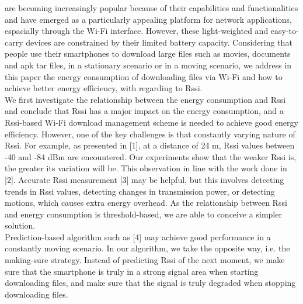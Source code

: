 \documentclass[journal]{IEEEtran}
\begin{document}
  are becoming increasingly popular because of
their capabilities and functionalities and have emerged as a particularly appealing platform for network applications, 
espacially through the Wi-Fi interface.
However, these light-weighted and easy-to-carry devices are constrained by their limited battery capacity.
Considering that people use their smartphones to download large files such as movies, documents and apk tar files, 
in a stationary scenario or in a moving scenario,
we address in this paper the energy consumption of downloading files via Wi-Fi and how to achieve better energy efficiency, 
with regarding to Rssi.
\\
\indent
We first investigate the relationship between the energy consumption and Rssi and conclude that Rssi has a major 
impact on the energy consumption, and a Rssi-based Wi-Fi download management scheme is needed to achieve good energy efficiency. 
However, one of the key challenges is that constantly varying nature of Rssi. For example, as presented in [1],
at a distance of 24 m, Rssi values between -40 and -84 dBm are encountered. Our experiments show that the weaker Rssi is, 
the greater its variation will be. This observation in line with the work done in [2]. Accurate Rssi measurement [3] may be helpful,  
but this involves detecting trends in Rssi values, detecting changes in transmission power, or detecting motions, which causes extra energy overhead. 
As the relationship between Rssi and energy consumption is threshold-based, 
we are able to conceive a simpler solution.
\\
\indent
Prediction-based algorithm such as [4] may achieve good performance in a constantly moving scenario. In our algorithm, 
we take the opposite way, i.e. the making-sure strategy.
Instead of predicting Rssi of the next moment, we make sure that the smartphone is truly in a strong signal 
area when starting downloading files, and make sure that the signal is truly degraded when stopping downloading files.
\end{document}
